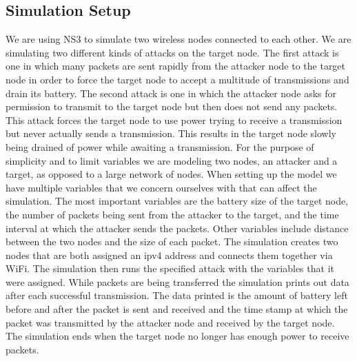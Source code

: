 \subsection{Simulation Setup}
We are using NS3 to simulate two wireless nodes connected to each other. We are simulating two different kinds of attacks on the target node. The first attack is one in which many packets are sent rapidly from the attacker node to the target node in order to force the target node to accept a multitude of transmissions and drain its battery. The second attack is one in which the attacker node asks for permission to transmit to the target node but then does not send any packets. This attack forces the target node to use power trying to receive a transmission but never actually sends a transmission. This results in the target node slowly being drained of power while awaiting a transmission. For the purpose of simplicity and to limit variables we are modeling two nodes, an attacker and a target, as opposed to a large network of nodes. When setting up the model we have multiple variables that we concern ourselves with that can affect the simulation. The most important variables are the battery size of the target node, the number of packets being sent from the attacker to the target, and the time interval at which the attacker sends the packets. Other variables include distance between the two nodes and the size of each packet. The simulation creates two nodes that are both assigned an ipv4 address and connects them together via WiFi. The simulation then runs the specified attack with the variables that it were assigned. While packets are being transferred the simulation prints out data after each successful transmission. The data printed is the amount of battery left before and after the packet is sent and received and the time stamp at which the packet was transmitted by the attacker node and received by the target node. The simulation ends when the target node no longer has enough power to receive packets.

